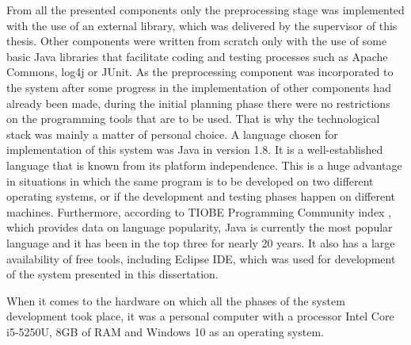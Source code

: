 From all the presented components only the preprocessing stage was implemented with the use of an external library, which was delivered by the supervisor of this thesis. Other components were written from scratch only with the use of some basic Java libraries that facilitate coding and testing processes such as Apache Commons, log4j or JUnit. As the preprocessing component was incorporated to the system after some progress in the implementation of other components had already been made, during the initial planning phase there were no restrictions on the programming tools that are to be used. That is why the technological stack was mainly a matter of personal choice. A language chosen for implementation of this system was Java in version 1.8. It is a well-established language that is known from its platform independence. This is a huge advantage in situations in which the same program is to be developed on two different operating systems, or if the development and testing phases happen on different machines. Furthermore, according to TIOBE Programming Community index \cite{tiobe}, which provides data on language popularity, Java is currently the most popular language and it has been in the top three for nearly 20 years. It also has a large availability of free tools, including Eclipse IDE, which was used for development of the system presented in this dissertation. 

When it comes to the hardware on which all the phases of the system development took place, it was a personal computer with a processor Intel Core i5-5250U, 8GB of RAM and Windows 10 as an operating system.